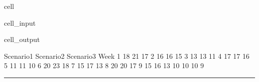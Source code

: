 \documentclass[letterpaper,10pt,english]{jupyterBook}
\begin{document}
\begin{sphinxuseclass}{cell}\begin{sphinxVerbatimInput}

\begin{sphinxuseclass}{cell_input}
\begin{sphinxVerbatim}[commandchars=\\\{\}]
\end{sphinxVerbatim}

\end{sphinxuseclass}\end{sphinxVerbatimInput}
\begin{sphinxVerbatimOutput}

\begin{sphinxuseclass}{cell_output}
\begin{sphinxVerbatim}[commandchars=\\\{\}]
      Scenario1  Scenario2  Scenario3
Week                                 
1            18         21         17
2            16         16         15
3            13         13         11
4            17         17         16
5            11         11         10
6            20         23         18
7            15         17         13
8            20         20         17
9            15         16         13
10           10         10          9
\end{sphinxVerbatim}

\end{sphinxuseclass}\end{sphinxVerbatimOutput}

\end{sphinxuseclass}

\bigskip\hrule\bigskip
\end{document}
